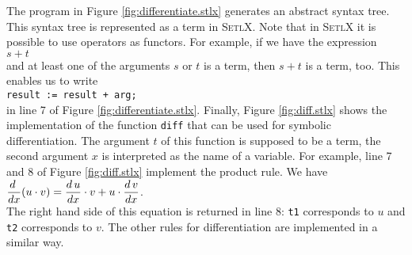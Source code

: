 The program in Figure \ref{fig:differentiate.stlx} generates an abstract syntax tree.
This syntax tree is represented as a term in \textsc{SetlX}.  Note that in \textsc{SetlX}
it is possible to use operators as functors.  For example, if we have the expression
\\[0.2cm]
\hspace*{1.3cm}
$s + t$
\\[0.2cm]
and at least one of the arguments $s$ or $t$ is a term, then $s + t$ is a term, too.
This enables us to write
\\[0.2cm]
\hspace*{1.3cm}
\texttt{result := result + arg;}
\\[0.2cm]
in line 7 of Figure \ref{fig:differentiate.stlx}.  Finally, Figure \ref{fig:diff.stlx}
shows the implementation of the function \texttt{diff} that can be used for symbolic
differentiation.  The argument $t$ of this function is supposed to be a term, the second
argument $x$ is interpreted as the name of a variable.  For example, line 7 and 8 of Figure
\ref{fig:diff.stlx} implement the product rule.  We have
\\[0.2cm]
\hspace*{1.3cm}
$\displaystyle\frac{d\;}{dx}(u \cdot v) = \frac{d\,u}{dx} \cdot v + u \cdot \frac{d\,v}{dx}$. 
\\[0.2cm]
The right hand side of this equation is returned in line 8: \texttt{t1} corresponds to $u$
and \texttt{t2} corresponds to $v$.  The other rules for differentiation are implemented
in a similar way.

